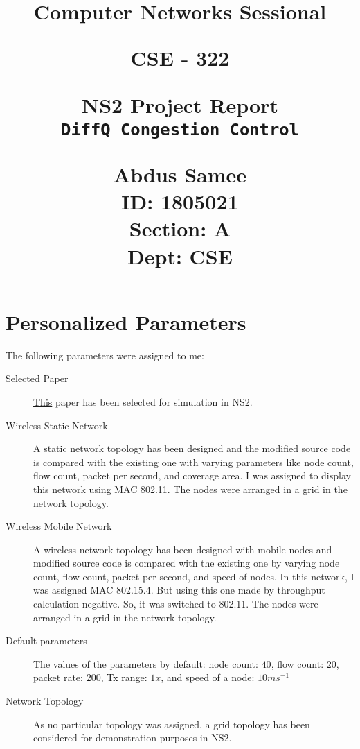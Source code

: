 \documentclass{article}
\title{%
  \begin{center}
        \vspace*{1cm}
            
        \Huge
        \textbf{Computer Networks Sessional}
            
        \vspace{0.5cm}
        \LARGE
        CSE - 322
            
        \vspace{1.5cm}
            
        \textbf{NS2 Project Report}\\
        \vspace{1cm}
        \Huge
        \texttt{DiffQ Congestion Control}
                        
        \vspace{0.8cm}
                        
        \Large
        Abdus Samee\\
        ID: 1805021\\
        Section: A\\
        Dept: CSE\\
    \end{center}
  }
\date{}
\begin{document}
\maketitle
\newpage

\section{Personalized Parameters}
The following parameters were assigned to me:

\begin{description}
    \item[Selected Paper] \href{https://www.researchgate.net/profile/Sangtae-Ha/publication/221245820_DiffQ_Practical_Differential_Backlog_Congestion_Control_for_Wireless_Networks/links/574b20e608ae5c51e29ea50c/DiffQ-Practical-Differential-Backlog-Congestion-Control-for-Wireless-Networks.pdf}{This} paper has been selected for simulation in NS2.
\end{description}
\begin{description}
     \item[Wireless Static Network] A static network topology has been designed and the modified source code is compared with the existing one with varying parameters like node count, flow count, packet per second, and coverage area. I was assigned to display this network using MAC 802.11. The nodes were arranged in a grid in the network topology.
 \end{description}
 \begin{description}
     \item[Wireless Mobile Network] A wireless network topology has been designed with mobile nodes and modified source code is compared with the existing one by varying node count, flow count, packet per second, and speed of nodes. In this network, I was assigned MAC 802.15.4. But using this one made by throughput calculation negative. So, it was switched to 802.11. The nodes were arranged in a grid in the network topology.
 \end{description}
 \begin{description}
     \item[Default parameters] The values of the parameters by default: node count: $40$, flow count: $20$, packet rate: $200$, Tx range: $1x$, and speed of a node: $10ms^{-1}$ 
 \end{description}
 \begin{description}
     \item[Network Topology] As no particular topology was assigned, a grid topology has been considered for demonstration purposes in NS2.
 \end{description}
\end{document}
